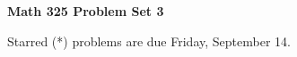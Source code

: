 \documentclass[12pt]{article}
\begin{document}
\def\ctln{\centerline}
\def\msk{\medskip}
\def\bsk{\bigskip}
\def\ssk{\smallskip}
\def\hsk{\hskip.3in}
\def\ra{\rightarrow}
\def\ubr{\underbar}
\def\dsp{\displaystyle}

\def\mt{{\mathcal T}}
\def\mb{{\mathcal B}}
\def\ms{{\mathcal S}}
\def\mu{{\mathcal U}}
\def\mv{{\mathcal V}}

\def\bbr{{\mathbb R}}
\def\bbz{{\mathbb Z}}
\def\bbq{{\mathbb Q}}
\def\bbn{{\mathbb N}}
\def\spc{$~$\hskip.15in$~$}

\def\sset{\subseteq}
\def\del{\partial}
\def\lra{$\Leftrightarrow$}
\def\bra{$\Rightarrow$}




\ctln{\bf Math 325 Problem Set 3}

\msk

\ctln{Starred (*) problems are due Friday, September 14.}
\end{document}
